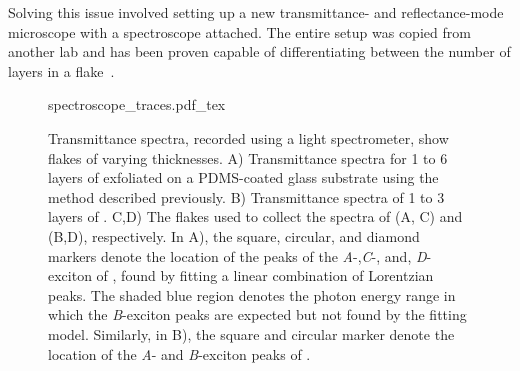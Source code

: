 Solving this issue involved setting up a new transmittance- and reflectance-mode microscope with a spectroscope attached. The entire setup was copied from another lab and has been proven capable of differentiating between the number of layers in a flake~\cite{frisendaMicroreflectanceTransmittanceSpectroscopy2017,niuThicknessDependentDifferentialReflectance2018}.

\begin{figure}[h!]
	\centering
	\def\svgwidth{1\linewidth}
	{spectroscope_traces.pdf_tex}
	\caption{Transmittance spectra, recorded using a light spectrometer, show flakes of varying thicknesses. A) Transmittance spectra for 1 to 6 layers of  exfoliated on a PDMS-coated glass substrate using the method described previously. 
    B) Transmittance spectra of 1 to 3 layers of .
    C,D) The flakes used to collect the spectra of  (A, C) and  (B,D), respectively.
    In A), the square, circular, and diamond markers denote the location of the peaks of the \textit{A}-,\textit{C}-, and, \textit{D}-exciton of , found by fitting a linear combination of Lorentzian peaks. The shaded blue region denotes the photon energy range in which the \textit{B}-exciton peaks are expected but not found by the fitting model.
    Similarly, in B), the square and circular marker denote the location of the \textit{A}- and \textit{B}-exciton peaks of .}
	\label{fig:spectroscope_traces}
\end{figure}



